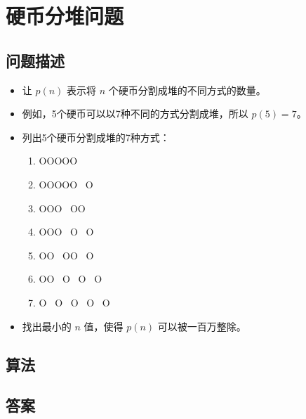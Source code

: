 \section{硬币分堆问题}\label{sec:problem78}
\subsection{问题描述}
\begin{tcolorbox}
\begin{itemize}
    \item 让 $p(n)$ 表示将 $n$ 个硬币分割成堆的不同方式的数量。
    \item 例如，5个硬币可以以7种不同的方式分割成堆，所以 $p(5) = 7$。
    \item 列出5个硬币分割成堆的7种方式：
    \begin{enumerate}
        \item OOOOO
        \item OOOOO \ O
        \item OOO \ OO
        \item OOO \ O \ O
        \item OO \ OO \ O
        \item OO \ O \ O \ O
        \item O \ O \ O \ O \ O
    \end{enumerate}
    \item 找出最小的 $n$ 值，使得 $p(n)$ 可以被一百万整除。
\end{itemize}
\end{tcolorbox}

\subsection{算法}


\subsection{答案}
